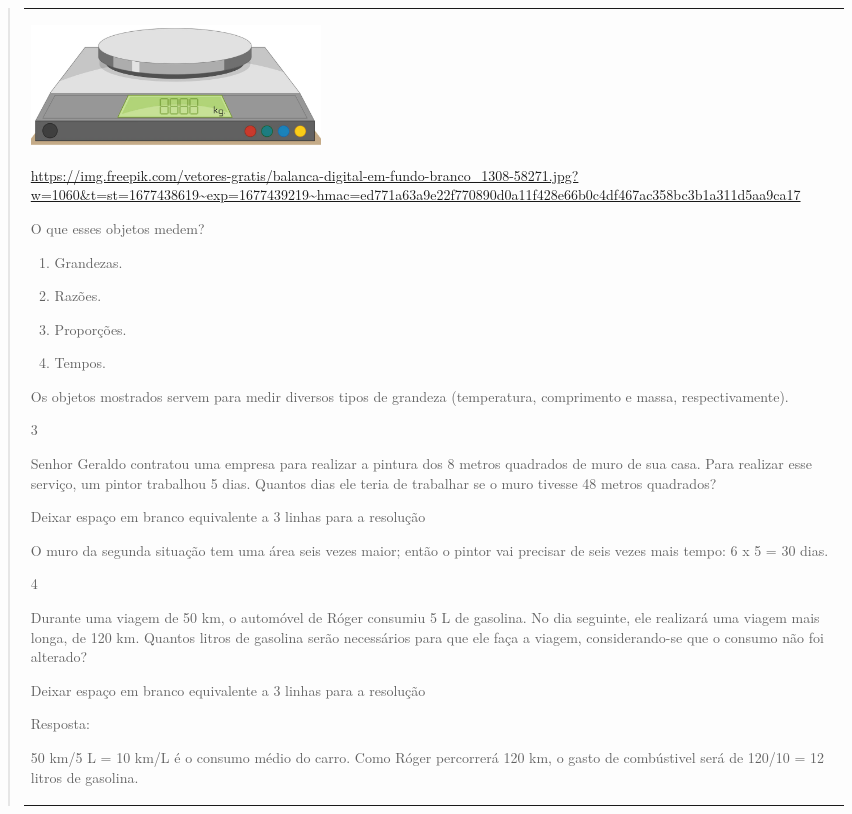 \begin{mdframed}[linewidth=2pt,linecolor=salmao,roundcorner=2pt]
\begin{itemize}
{\begin{itemize}
\begin{escolha}
{\begin{quote}
{\begin{escolha}
{{{{{\begin{longtable}[]{@{}l@{}}
\begin{itemize}
\includegraphics[width=3.02500in,height=1.27488in]{media/image130.png}

\url{https://img.freepik.com/vetores-gratis/balanca-digital-em-fundo-branco_1308-58271.jpg?w=1060\&t=st=1677438619~exp=1677439219~hmac=ed771a63a9e22f770890d0a11f428e66b0c4df467ac358bc3b1a311d5aa9ca17}

O que esses objetos medem?

\begin{enumerate}
\item
  Grandezas.
\item
  Razões.
\item
  Proporções.
\item
  Tempos.
\end{enumerate}

Os objetos mostrados servem para medir diversos tipos de grandeza (temperatura, comprimento e massa, respectivamente).

\num{3}

Senhor Geraldo contratou uma empresa para realizar a pintura dos 8
metros quadrados de muro de sua casa. Para realizar esse serviço, um pintor
trabalhou 5 dias. Quantos dias ele teria de trabalhar se o muro tivesse
48 metros quadrados?

Deixar espaço em branco equivalente a 3 linhas para a resolução

O muro da segunda situação tem uma área seis vezes maior; então o pintor vai precisar de seis vezes mais tempo: 6 x 5 = 30 dias.

\num{4}

Durante uma viagem de 50 km, o automóvel de Róger consumiu 5 L de
gasolina. No dia seguinte, ele realizará uma viagem mais longa, de 120 km.
Quantos litros de gasolina serão necessários para que ele faça a viagem,
considerando-se que o consumo não foi alterado?

Deixar espaço em branco equivalente a 3 linhas para a resolução

Resposta:

50 km/5 L = 10 km/L é o consumo médio do carro.
Como Róger percorrerá 120 km, o gasto de combústivel será de 120/10 = 12
litros de gasolina.


\end{itemize}
\end{longtable}}}}}}
\end{escolha}}
\end{quote}}
\end{escolha}
\end{itemize}}
\end{itemize}
\end{mdframed}
